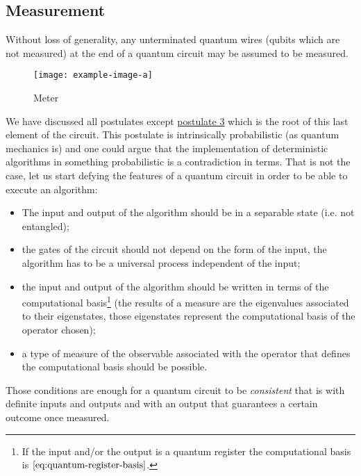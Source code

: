 \subsection{Measurement}
\begin{theorem}
Without loss of generality, any unterminated quantum wires (qubits which are not measured) at the end of a quantum circuit may be assumed to be measured. \cite[p.187]{Shankar}
\end{theorem}
\begin{figure}[htb]
\centering
\texttt{[image: example-image-a]}
\caption{Meter}
\label{fig:measurement}
\end{figure}
We have discussed all postulates except \hyperref[postulate:3]{postulate 3} which is the root of this last element of the circuit.
This postulate is intrinsically probabilistic (as quantum mechanics is) and one could argue that the implementation of deterministic algorithms in something probabilistic is a contradiction in terms.
That is not the case, let us start defying the features of a quantum circuit in order to be able to execute an algorithm:
\begin{itemize}
    \item The input and output of the algorithm should be in a separable state (i.e. not entangled);
    \item the gates of the circuit should not depend on the form of the input, the algorithm has to be a universal process independent of the input;
    \item the input and output of the algorithm should be written in terms of the computational basis\footnote{If the input and/or the output is a quantum register the computational basis is $\eqref{eq:quantum-register-basis}$.} (the results of a measure are the eigenvalues associated to their eigenstates, those eigenstates represent the computational basis of the operator chosen);
    \item a type of measure of the observable associated with the operator that defines the computational basis should be possible.
\end{itemize}

Those conditions are enough for a quantum circuit to be \emph{consistent} that is with definite inputs and outputs and with an output that guarantees a certain outcome once measured.
